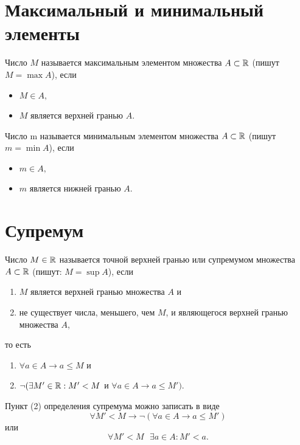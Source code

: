 	\section{Максимальный и минимальный элементы}
	
	\begin{definition}
		Число $M$ называется максимальным элементом множества $A \subset \mathbb R$ (пишут $M = \max{A}$), если
		\begin{itemize}
			\item $M \in A,$
			\item $M$ является верхней гранью $A$.
		\end{itemize}
		Число m называется минимальным элементом множества $A \subset \mathbb R$ (пишут $m = \min{A}$), если
		\begin{itemize}
			\item $m \in A,$
			\item $m$ является нижней гранью $A$.
		\end{itemize}
	\end{definition}
	
	\section{Супремум}
	
	\begin{definition}
		Число $M \in \mathbb R$ называется точной верхней гранью или супремумом множества $A \subset \mathbb R$ (пишут: $M = \sup{A}$), если
		\begin{enumerate}
			\item $M$ является верхней гранью множества $A$ и
			\item не существует числа, меньшего, чем $M$, и являющегося верхней гранью множества $A$,
		\end{enumerate}
		то есть
		\begin{enumerate}
			\item $\forall a \in A \rightarrow a \leqslant M$ и
			\item $\neg (\exists M' \in \mathbb R : M' < M$ и $\forall a \in A \rightarrow a \leqslant M').$
		\end{enumerate}
	\end{definition}
	
	\begin{mention}
		Пункт (2) определения супремума можно записать в виде
		\[ \forall M' < M \rightarrow \neg (\forall a \in A \rightarrow a \leqslant M')\]		
		или
		\[ \forall M' < M \text{ } \exists a \in A : M' < a. \]
	\end{mention}
	
